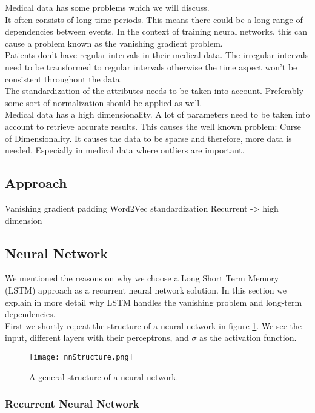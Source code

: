 Medical data has some problems which we will discuss.\\
It often consists of long time periods. This means there could be a long range of dependencies between events. In the context of training neural networks, this can cause a problem known as the vanishing gradient problem. \\
Patients don't have regular intervals in their medical data. The irregular intervals need to be transformed to regular intervals otherwise the time aspect won't be consistent throughout the data. \\
The standardization of the attributes needs to be taken into account. Preferably some sort of normalization should be applied as well. \\
Medical data has a high dimensionality. A lot of parameters need to be taken into account to retrieve accurate results. This causes the well known problem: Curse of Dimensionality. It causes the data to be sparse and therefore, more data is needed. Especially in medical data where outliers are important. 


\subsection{Approach}

Vanishing gradient
padding
Word2Vec standardization
Recurrent -> high dimension


\subsection{Neural Network}

We mentioned the reasons on why we choose a Long Short Term Memory (LSTM) approach as a recurrent neural network solution. In this section we explain in more detail why LSTM handles the vanishing problem and long-term dependencies. \\

First we shortly repeat the structure of a neural network in figure \ref{fig:nnStructure}. We see the input, different layers with their perceptrons, and $\sigma$ as the activation function. 

\begin{figure}[H]
	\centering
	\texttt{[image: nnStructure.png]}
	\caption{A general structure of a neural network.}
	\label{fig:nnStructure}
\end{figure} 

\subsubsection{Recurrent Neural Network}




